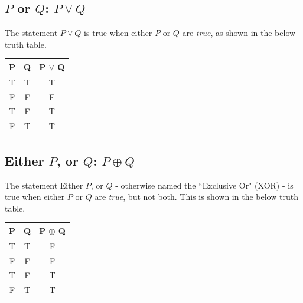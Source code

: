 \documentclass{article}
\begin{document}
\subsection{$P$ or $Q$: $P \lor Q$}

The statement $P \lor Q$ is true when either $P$ or $Q$ are \textit{true}, as shown in the below truth table.

\begin{table}[!htb]
    \centering
    \begin{tabular}{|c|c|c|}
        \hline
        \textbf{P} & \textbf{Q} & \textbf{P $\lor$ Q} \\ \hline
        \rowcolor[HTML]{67FD9A} 
        T          & T          & T                             \\ \hline
        F          & F          & F                             \\ \hline
        \rowcolor[HTML]{67FD9A} 
        T          & F          & T                             \\ \hline
        \rowcolor[HTML]{67FD9A} 
        F          & T          & T                             \\ \hline
    \end{tabular}
\end{table}

\subsection{Either $P$, or $Q$: $P \oplus Q$}

The statement Either $P$, or $Q$ - otherwise named the ``Exclusive Or" (XOR) - is true when either $P$ or $Q$ are \textit{true}, but not both. This is shown in the below truth table.

\begin{table}[!htb]
    \centering
    \begin{tabular}{|c|c|c|}
        \hline
        \textbf{P} & \textbf{Q} & \textbf{P $\oplus$ Q} \\ \hline
        T          & T          & F                             \\ \hline
        F          & F          & F                             \\ \hline
        \rowcolor[HTML]{67FD9A} 
        T          & F          & T                             \\ \hline
        \rowcolor[HTML]{67FD9A} 
        F          & T          & T                             \\ \hline
    \end{tabular}
\end{table}
\end{document}
